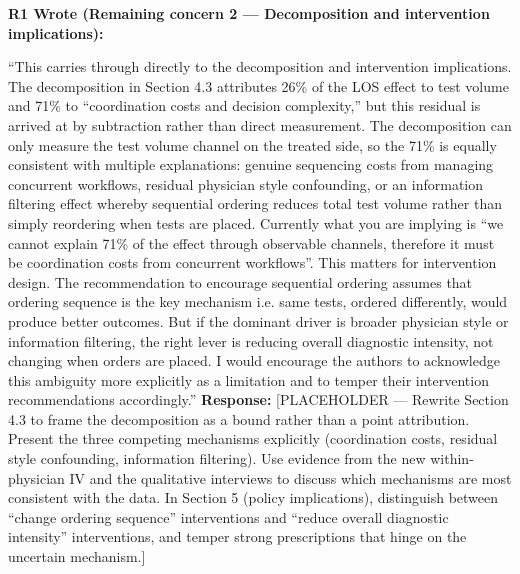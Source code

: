 \documentclass[11pt]{article}
\newenvironment{quote2}
{ \bigskip
\noindent
         \small\em
         \baselineskip=14pt
}
\newcommand{\1}{\hbox{\rm 1\kern-.35em 1}}
\begin{document}
\begin{quote2}
\textbf{R1 Wrote (Remaining concern 2 --- Decomposition and intervention implications):}

\noindent ``This carries through directly to the decomposition and intervention implications. The decomposition in Section 4.3 attributes 26\% of the LOS effect to test volume and 71\% to ``coordination costs and decision complexity,'' but this residual is arrived at by subtraction rather than direct measurement. The decomposition can only measure the test volume channel on the treated side, so the 71\% is equally consistent with multiple explanations: genuine sequencing costs from managing concurrent workflows, residual physician style confounding, or an information filtering effect whereby sequential ordering reduces total test volume rather than simply reordering when tests are placed. Currently what you are implying is ``we cannot explain 71\% of the effect through observable channels, therefore it must be coordination costs from concurrent workflows''. This matters for intervention design. The recommendation to encourage sequential ordering assumes that ordering sequence is the key mechanism i.e. same tests, ordered differently, would produce better outcomes. But if the dominant driver is broader physician style or information filtering, the right lever is reducing overall diagnostic intensity, not changing when orders are placed. I would encourage the authors to acknowledge this ambiguity more explicitly as a limitation and to temper their intervention recommendations accordingly.''
\end{quote2}

\noindent\textbf{Response:} \color{blue}[PLACEHOLDER --- Rewrite Section 4.3 to frame the decomposition as a bound rather than a point attribution. Present the three competing mechanisms explicitly (coordination costs, residual style confounding, information filtering). Use evidence from the new within-physician IV and the qualitative interviews to discuss which mechanisms are most consistent with the data. In Section 5 (policy implications), distinguish between ``change ordering sequence'' interventions and ``reduce overall diagnostic intensity'' interventions, and temper strong prescriptions that hinge on the uncertain mechanism.]
\color{black}
\end{document}
